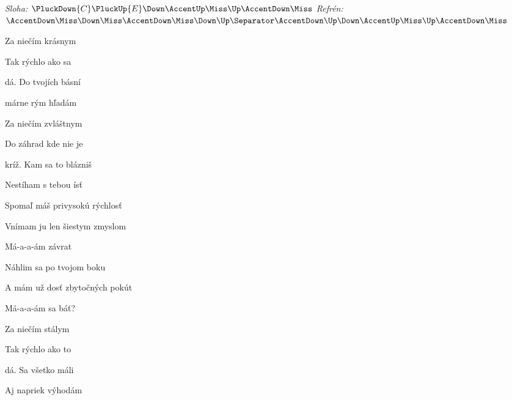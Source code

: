 \begin{song}


\begin{headerbox}
\RaiseBoxWithAccents
\textit{Sloha:} $\PluckDown{C}\PluckUp{E}\Down\AccentUp\Miss\Up\AccentDown\Miss$ \quad
\textit{Refrén:} $\AccentDown\Miss\Down\Miss\AccentDown\Miss\Down\Up \Separator \AccentDown\Up\Down\AccentUp\Miss\Up\AccentDown\Miss$
\end{headerbox}

\begin{hchordbox}
\end{hchordbox}

\Large

\bigskip


 Za niečím krásnym \par
{} Tak rýchlo ako sa \par
{}dá. Do tvojích básní \par
{}márne rým hľadám \par

\bigskip

 Za niečím zvláštnym \par
{} Do záhrad kde nie je \par
{}kríž. Kam sa to blázniš \par
Nestíham s tebou ísť \par

\bigskip

Spomaľ máš privysokú rýchlosť \par
{}Vnímam ju len šiestym zmyslom \par
{}Má-a-a-ám závrat  \par
{}Náhlim sa po tvojom boku \par
A mám už dosť zbytočných pokút \par
{}Má-a-a-ám sa báť?  \par

\bigskip

 Za niečím stálym \par
{} Tak rýchlo ako to \par
{}dá. Sa všetko máli \par
Aj napriek výhodám \par


\end{song}
